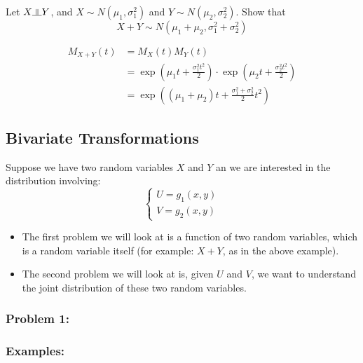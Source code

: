 \documentclass{article}
\newcommand{\indep}{\rotatebox[origin=c]{90}{$\models$}}
\begin{document}
Let $X \indep Y$, and $X\sim N(\mu_1,\sigma_1^2)$ and $Y\sim N(\mu_2,\sigma_2^2)$. Show that
\begin{equation*}
    X+Y \sim N(\mu_1 + \mu_2, \sigma_1^2 + \sigma_2^2)
\end{equation*}

\begin{equation*}
    \begin{split}
        M_{X+Y}(t) &= M_X(t) M_Y(t)\\
            &= \exp \left( \mu_1 t + \frac{\sigma_1^2 t^2}{2} \right) \cdot \exp \left(\mu_2 t + \frac{\sigma_2^2 t^2}{2} \right)\\
            &= \exp \left( \left(\mu_1+ \mu_2\right) t + \frac{\sigma_1^2 + \sigma_2^2}{2} t^2 \right)
    \end{split}
\end{equation*}


\subsection{Bivariate Transformations}

Suppose we have two random variables $X$ and $Y$ an we are interested in the distribution involving: 
\begin{equation*}
    \begin{cases}
        U = g_1(x,y)\\
        V = g_2(x,y)
    \end{cases}
\end{equation*}
\begin{itemize}
    \item The first problem we will look at is a function of two random variables, which is a random variable itself (for example: $X+Y$, as in the above example). 
    \item The second problem we will look at is, given $U$ and $V$, we want to understand the joint distribution of these two random variables.
\end{itemize}


\subsubsection{Problem 1:}

\subsubsection*{Examples:}
\end{document}
